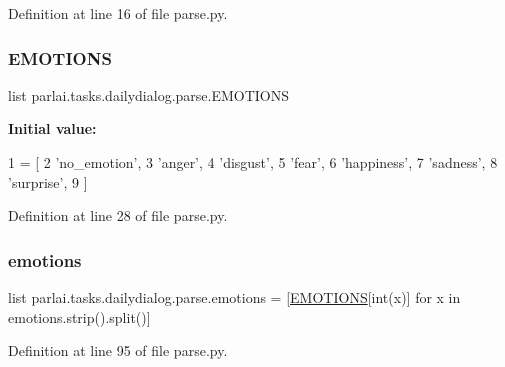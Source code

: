 Definition at line 16 of file parse.\+py.

\mbox{\label{namespaceparlai_1_1tasks_1_1dailydialog_1_1parse_a4dcf4c3798e88e5b49c655dee367234d}} 
\subsubsection{\texorpdfstring{E\+M\+O\+T\+I\+O\+NS}{EMOTIONS}}
{\footnotesize\ttfamily list parlai.\+tasks.\+dailydialog.\+parse.\+E\+M\+O\+T\+I\+O\+NS}

{\bfseries Initial value\+:}
\begin{DoxyCode}
1 =  [
2     \textcolor{stringliteral}{'no\_emotion'},
3     \textcolor{stringliteral}{'anger'},
4     \textcolor{stringliteral}{'disgust'},
5     \textcolor{stringliteral}{'fear'},
6     \textcolor{stringliteral}{'happiness'},
7     \textcolor{stringliteral}{'sadness'},
8     \textcolor{stringliteral}{'surprise'},
9 ]
\end{DoxyCode}


Definition at line 28 of file parse.\+py.

\mbox{\label{namespaceparlai_1_1tasks_1_1dailydialog_1_1parse_adfeb415521d435bbc0f876aa2d7c7a76}} 
\subsubsection{\texorpdfstring{emotions}{emotions}}
{\footnotesize\ttfamily list parlai.\+tasks.\+dailydialog.\+parse.\+emotions = \mbox{[}\hyperlink{namespaceparlai_1_1tasks_1_1dailydialog_1_1parse_a4dcf4c3798e88e5b49c655dee367234d}{E\+M\+O\+T\+I\+O\+NS}\mbox{[}int(x)\mbox{]} for x in emotions.\+strip().split()\mbox{]}}



Definition at line 95 of file parse.\+py.

\mbox{\label{namespaceparlai_1_1tasks_1_1dailydialog_1_1parse_a770d23d03169b162728cd3059fb9ac6e}} 
